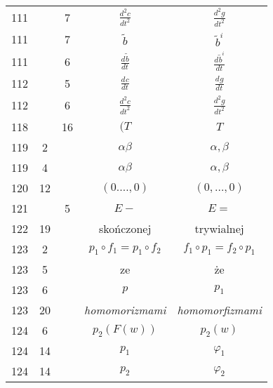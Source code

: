 \documentclass[a4paper,11pt]{article}
\newcommand{\ld}{\ldots}
\newcommand{\al}{\alpha}
\newcommand{\be}{\beta}
\newcommand{\vp}{\varphi}
\newcommand{\wt}{\widetilde}
\newcommand{\dd}[3]{\frac{ d^{ #1 } { #2 } }{ d { #3 }^{ #1 } }}
\begin{document}
\begin{center}
\begin{tabular}{|c|c|c|c|c|}
    111 & &  7 & $\dd{ 2 }{ c }{ t }$ & $\dd{ 2 }{ g }{ t }$ \\
    111 & &  7 & $\wt{ b }$ & $\wt{ b }^{ i }$ \\
    111 & &  6 & $\dd{}{ \wt{ b } }{ t }$
           & $\dd{}{ \wt{ b }^{ i } }{ t }$ \\
    112 & &  5 & $\dd{}{ c }{ t }$ & $\dd{}{ g }{ t }$ \\
    112 & &  6 & $\dd{ 2 }{ c }{ t }$ & $\dd{ 2 }{ g }{ t }$ \\
    118 & & 16 & $(T$ & $T$ \\
    119 &  2 & & $\al\be$ & $\al, \be$ \\
    119 &  4 & & $\al\be$ & $\al, \be$ \\
    120 & 12 & & $( 0. \ld, 0 )$ & $( 0, \ld, 0 )$ \\
    121 & & 5 & $E -$ & $E =$ \\
    122 & 19 & & skończonej & trywialnej \\
    123 &  2 & & $p_{ 1 } \circ f_{ 1 } = p_{ 1 } \circ f_{ 2 }$
           & $f_{ 1 } \circ p_{ 1 } = f_{ 2 } \circ p_{ 1 }$ \\
    123 &  5 & & ze & że \\
    123 &  6 & & $p$ & $p_{ 1 }$ \\
    123 & 20 & & \emph{homomorizmami} & \emph{homomorfizmami} \\
    124 &  6 & & $p_{ 2 }( F( w ) )$ & $p_{ 2 }( w )$ \\
    124 & 14 & & $p_{ 1 }$ & $\vp_{ 1 }$ \\
    124 & 14 & & $p_{ 2 }$ & $\vp_{ 2 }$ \\ \hline
  \end{tabular}



\end{center}
\end{document}

